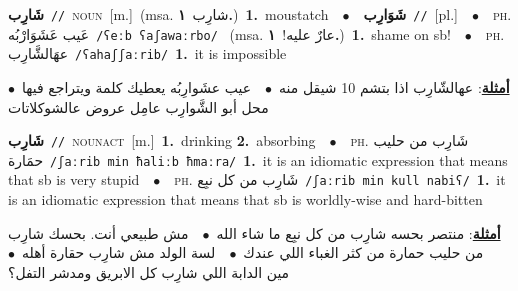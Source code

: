 \documentclass[10pt,a4paper,twoside]{article} %
\begin{document}
\begin{multicols}{2}
{\setlength\topsep{0pt}\textbf{\foreignlanguage{arabic}{شَارِب}}\ {\color{gray}\texttt{//}\color{black}}\ \textsc{noun}\ [m.]\ \color{gray}(msa. \foreignlanguage{arabic}{شارِب}~\foreignlanguage{arabic}{\textbf{١.}})\color{black}\ \textbf{1.}~moustatch\ \ $\bullet$\ \ \setlength\topsep{0pt}\textbf{\foreignlanguage{arabic}{شَوَارِب}}\ {\color{gray}\texttt{//}\color{black}}\ [pl.]\ \ $\bullet$\ \ \textsc{ph.} \color{gray} \foreignlanguage{arabic}{عَيب عَشَوَارْبُه}\color{black}\ {\color{gray}\texttt{/{\sffamily ʕeːb ʕaʃawaːrbo}/}\color{black}}\ \color{gray} (msa. \foreignlanguage{arabic}{عارٌ عليه!}~\foreignlanguage{arabic}{\textbf{١.}})\color{black}\ \textbf{1.}~shame on sb!\ \ $\bullet$\ \ \textsc{ph.} \color{gray} \foreignlanguage{arabic}{عهَالشَّارِب}\color{black}\ {\color{gray}\texttt{/{\sffamily ʕahaʃʃaːrib}/}\color{black}}\ \textbf{1.}~it is impossible\  \begin{flushright}\color{gray}\foreignlanguage{arabic}{\textbf{\underline{\foreignlanguage{arabic}{أمثلة}}}: عهالشّارِب اذا بتشم 10 شيقل منه\ $\bullet$\ \  عيب عشَوارِبُه يعطيك كلمة ويتراجع فيها\ $\bullet$\ \  محل أبو الشَّوارِب عامِل عروض عالشوكلاتات}\end{flushright}\color{black}} \vspace{2mm}

{\setlength\topsep{0pt}\textbf{\foreignlanguage{arabic}{شَارِب}}\ {\color{gray}\texttt{//}\color{black}}\ \textsc{noun\textunderscore act}\ [m.]\ \textbf{1.}~drinking  \textbf{2.}~absorbing\ \ $\bullet$\ \ \textsc{ph.} \color{gray} \foreignlanguage{arabic}{شَارِب من حليب حمَارة}\color{black}\ {\color{gray}\texttt{/{\sffamily ʃaːrib min ħaliːb ħmaːra}/}\color{black}}\ \textbf{1.}~it is an idiomatic expression that means that sb is very stupid\ \ $\bullet$\ \ \textsc{ph.} \color{gray} \foreignlanguage{arabic}{شَارِب من كل نبِع}\color{black}\ {\color{gray}\texttt{/{\sffamily ʃaːrib min kull nabiʕ}/}\color{black}}\ \textbf{1.}~it is an idiomatic expression that means that sb is worldly-wise and hard-bitten\  \begin{flushright}\color{gray}\foreignlanguage{arabic}{\textbf{\underline{\foreignlanguage{arabic}{أمثلة}}}: منتصر بحسه شارِب من كل نبِع ما شاء الله\ $\bullet$\ \  مش طبيعي أنت. بحسك شارِب من حليب حمارة من كثر الغباء اللي عندك\ $\bullet$\ \  لسة الولد مش شارِب حقارة أهله\ $\bullet$\ \  مين الدابة اللي شارِب كل الابريق ومدشر التفل؟}\end{flushright}\color{black}} \vspace{2mm}


\end{multicols}
\end{document}
